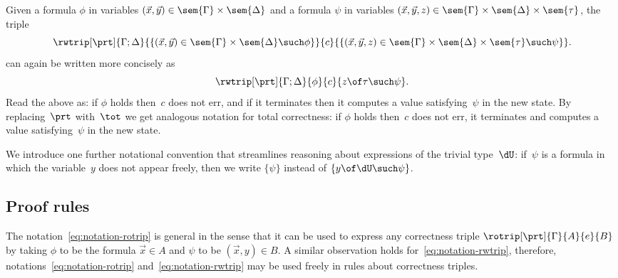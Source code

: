 Given a formula $\phi$ in variables $(\vec{x}, \vec{y}) \in \sem{\Gamma} \times \sem{\Delta}$ and a formula $\psi$ in variables $(\vec{x}, \vec{y}, z) \in \sem{\Gamma} \times \sem{\Delta} \times \sem{\tau}$,
the triple
%
\begin{equation*}
  \rwtrip[\prt]
  {\Gamma; \Delta} {\{(\vec{x}, \vec{y}) \in \sem{\Gamma} \times \sem{\Delta} \such \phi\}}
  {c}
  {\{(\vec{x}, \vec{y}, z) \in \sem{\Gamma} \times \sem{\Delta} \times \sem{\tau} \such \psi\}}.
\end{equation*}
%
can again be written more concisely as
%
\begin{equation}
  \label{eq:notation-rwtrip}
  \rwtrip[\prt]{\Gamma; \Delta} {\phi} {c} {z \of \tau \such \psi}.
\end{equation}
%
Read the above as: if $\phi$ holds then~$c$ does not err, and if it terminates then it computes a value satisfying~$\psi$ in the new state.
By replacing~$\prt$ with~$\tot$ we get analogous notation for total correctness: if $\phi$ holds then~$c$ does not err, it terminates and computes a value satisfying~$\psi$ in the new state.

We introduce one further notational convention that streamlines reasoning about expressions of the trivial type~$\dU$: if~$\psi$ is a formula in which the variable~$y$ does not appear freely, then we write $\{ \psi \}$ instead of $\{ y \of \dU \such \psi \}$.


\subsection{Proof rules}
\label{sec:proof-rules}

The notation~\eqref{eq:notation-rotrip} is general in the sense that it can be used to express any correctness triple $\rotrip[\prt]{\Gamma}{A}{e}{B}$ by taking $\phi$ to be the formula $\vec{x} \in A$ and $\psi$ to be $(\vec{x}, y) \in B$.
%
A similar observation holds for~\eqref{eq:notation-rwtrip}, therefore, notations~\eqref{eq:notation-rotrip} and~\eqref{eq:notation-rwtrip} may be used freely in rules about correctness triples.

